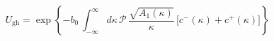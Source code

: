 \begin{equation}
U_{\text{gh}}=\exp\left\{
-b_0\,\int_{-\infty}^{\infty}d\kappa\,
\mathscr{P}\,\frac{\sqrt{A_1(\kappa)}}{\kappa}\,
\bigl[c^{-}(\kappa)+c^{+}(\kappa)\bigr]
\right\}
\label{Ugh}
\end{equation}

